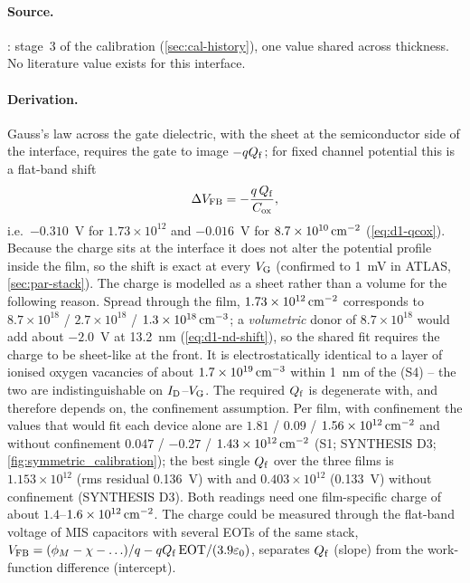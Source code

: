 \paragraph{Source.}
: stage~3 of the calibration (\cref{sec:cal-history}), one value shared across thickness. No
literature value exists for this interface.

\paragraph{Derivation.}
Gauss's law across the gate dielectric, with the sheet at the semiconductor side of the interface, requires the
gate to image $-qQ_{\mathrm{f}}$; for fixed channel potential this is a flat-band shift
\begin{equation}
  \Delta V_{\mathrm{FB}} = -\frac{q\,Q_{\mathrm{f}}}{C_{\mathrm{ox}}},
  \label{eq:flatband-shift}
\end{equation}
i.e.\ $-0.310$~V for $1.73\times10^{12}$ and $-0.016$~V for $8.7\times10^{10}\,\mathrm{cm}^{-2}$ (\cref{eq:d1-qcox}). Because the
charge sits at the interface it does not alter the potential profile inside the film, so the shift is exact at every
$V_{\mathrm{G}}$ (confirmed to 1~mV in ATLAS, \cref{sec:par-stack}). The charge is modelled as a sheet rather than a volume for the following reason. Spread through the film,
$1.73\times10^{12}\,\mathrm{cm}^{-2}$ corresponds to $8.7\times10^{18}$ / $2.7\times10^{18}$ / $1.3\times10^{18}\,\mathrm{cm}^{-3}$; a
\emph{volumetric} donor of $8.7\times10^{18}$ would add about $-2.0$~V at 13.2~nm (\cref{eq:d1-nd-shift}), so the shared
fit requires the charge to be sheet-like at the front. It is electrostatically identical to a layer of ionised oxygen
vacancies of about $1.7\times10^{19}\,\mathrm{cm}^{-3}$ within 1~nm of the \AlO{} (S4) -- the two are indistinguishable on
$I_{\mathrm{D}}$--$V_{\mathrm{G}}$. The required $Q_{\mathrm{f}}$ is degenerate with, and therefore depends on, the confinement assumption. Per film, with confinement
the values that would fit each device alone are $1.81$ / $0.09$ / $1.56\times10^{12}\,\mathrm{cm}^{-2}$ and without confinement
$0.047$ / $-0.27$ / $1.43\times10^{12}\,\mathrm{cm}^{-2}$ (S1; SYNTHESIS D3; \cref{fig:symmetric_calibration}); the best single $Q_{\mathrm{f}}$ over the
three films is $1.153\times10^{12}$ (rms residual 0.136~V) with and $0.403\times10^{12}$ (0.133~V) without confinement
(SYNTHESIS D3). Both readings need one film-specific charge of about $1.4$--$1.6\times10^{12}\,\mathrm{cm}^{-2}$. The charge could
be measured through the flat-band voltage of MIS capacitors with several EOTs of the same stack, $V_{\mathrm{FB}} =
(\phi_M-\chi-\ldots)/q - qQ_{\mathrm{f}}\,\mathrm{EOT}/(3.9\varepsilon_0)$, separates $Q_{\mathrm{f}}$ (slope) from the work-function difference
(intercept).

